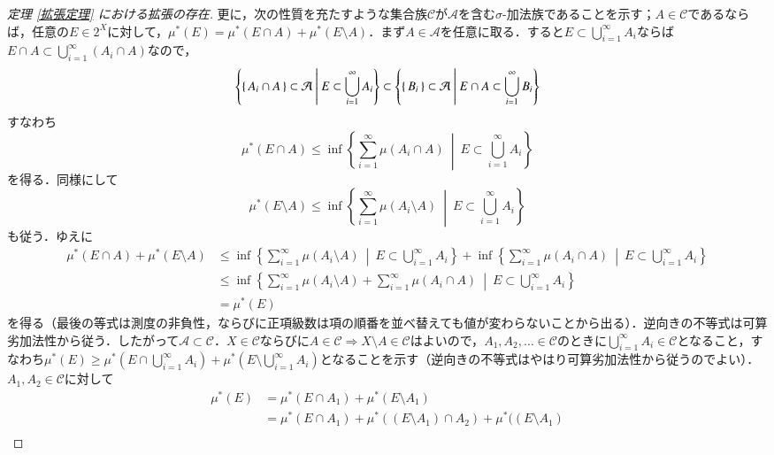 \begin{proof}[定理 \ref{拡張定理} における拡張の存在]
更に，次の性質を充たすような集合族$\mathcal{C}$が$\mathcal{A}$を含む$\sigma$-加法族であることを示す；$A \in \mathcal{C}$であるならば，任意の$E \in 2^X$に対して，$\mu^*(E) = \mu^*(E \cap A) + \mu^*(E \setminus A)$．まず$A \in \mathcal{A}$を任意に取る．すると$E \subset \bigcup_{i=1}^\infty A_i$ならば$E \cap A \subset \bigcup_{i=1}^\infty (A_i \cap A)$なので，
\begin{equation}
\left\{ \set{A_i \cap A} \subset \mathcal{A} \ \middle| \  E \subset \bigcup_{i=1}^\infty A_i \right\} \subset
\left\{ \set{B_i} \subset \mathcal{A} \ \middle| \  E \cap A \subset \bigcup_{i=1}^\infty B_i \right\} 
\end{equation}すなわち
\begin{equation}
\mu^*(E \cap A) \leq \inf \left\{ \sum_{i=1}^\infty \mu(A_i \cap A) \ \middle| \  E \subset \bigcup_{i=1}^\infty A_i \right\}
\end{equation}を得る．同様にして
\begin{equation}
\mu^*(E \setminus A) \leq \inf \left\{ \sum_{i=1}^\infty \mu(A_i \setminus A) \ \middle| \  E \subset \bigcup_{i=1}^\infty A_i \right\}
\end{equation}も従う．ゆえに
\begin{align}
\mu^*(E \cap A) + \mu^*(E \setminus A) &\leq \inf \left\{ \sum_{i=1}^\infty \mu(A_i \setminus A) \ \middle| \  E \subset \bigcup_{i=1}^\infty A_i \right\} + \inf \left\{ \sum_{i=1}^\infty \mu(A_i \cap A) \ \middle| \  E \subset \bigcup_{i=1}^\infty A_i \right\} \\
&\leq \inf \left\{ \sum_{i=1}^\infty \mu(A_i \setminus A) + \sum_{i=1}^\infty \mu(A_i \cap A) \ \middle| \  E \subset \bigcup_{i=1}^\infty A_i \right\} \\
&= \mu^*(E)
\end{align}を得る（最後の等式は測度の非負性，ならびに正項級数は項の順番を並べ替えても値が変わらないことから出る）．逆向きの不等式は可算劣加法性から従う．したがって$\mathcal{A} \subset \mathcal{C}$．$X \in \mathcal{C}$ならびに$A \in \mathcal{C} \Rightarrow X \setminus A \in \mathcal{C}$はよいので，$A_1, A_2, \dots \in \mathcal{C}$のときに$\bigcup_{i=1}^\infty A_i \in \mathcal{C}$となること，すなわち$\mu^*(E) \geq \mu^*(E \cap \bigcup_{i=1}^\infty A_i) + \mu^*(E \setminus \bigcup_{i=1}^\infty A_i)$となることを示す（逆向きの不等式はやはり可算劣加法性から従うのでよい）．$A_1, A_2 \in \mathcal{C}$に対して
\begin{align}
\mu^*(E) &= \mu^* (E \cap A_1) + \mu^*(E \setminus A_1) \\
&= \mu^*(E \cap A_1) + \mu^*((E \setminus A_1) \cap A_2) + \mu^*((E \setminus A_1)\\

\end{align}
\end{proof}
